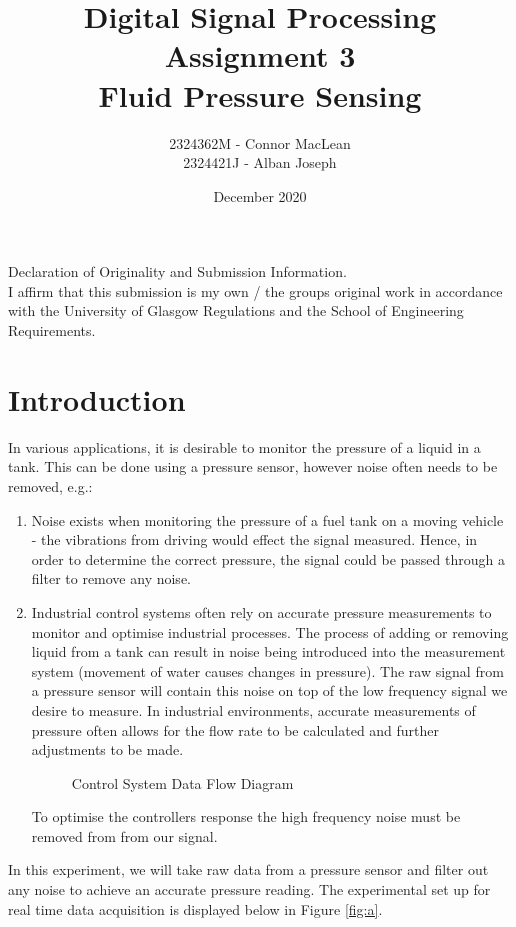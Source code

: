 \documentclass{article}
\title{Digital Signal Processing\\Assignment 3\\Fluid Pressure Sensing}
\author{2324362M - Connor MacLean\\2324421J - Alban Joseph}
\date{December 2020}
\begin{document}
\maketitle
Declaration of Originality and Submission Information.\\
I affirm that this submission is my own / the groups original work in accordance with the University of Glasgow Regulations and the School of Engineering Requirements.
\section{Introduction}
In various applications, it is desirable to monitor the pressure of a liquid in a tank. This can be done using a pressure sensor, however noise often needs to be removed, e.g.:
\begin{enumerate}
  \item Noise exists when monitoring the pressure of a fuel tank on a moving vehicle - the vibrations from driving would effect the signal measured. Hence, in order to determine the correct pressure, the signal could be passed through a filter to remove any noise.
  \item Industrial control systems often rely on accurate pressure measurements to monitor and optimise industrial processes. The process of adding or removing liquid from a tank can result in noise being introduced into the measurement system (movement of water causes changes in pressure). The raw signal from a pressure sensor will contain this noise on top of the low frequency signal we desire to measure. In industrial environments, accurate measurements of pressure often allows for the flow rate to be calculated and further adjustments to be made.
\begin{figure}[H]
    \centering
    
    \caption{Control System Data Flow Diagram}
    \label{fig:controlSys}
\end{figure}
To optimise the controllers response the high frequency noise must be removed from from our signal.
\end{enumerate}
In this experiment, we will take raw data from a pressure sensor and filter out any noise to achieve an accurate pressure reading. The experimental set up for real time data acquisition is displayed below in Figure \ref{fig:a}.
\end{document}
